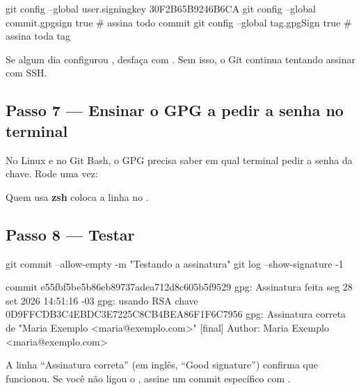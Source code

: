 \begin{terminal}
git config --global user.signingkey 30F2B65B9246B6CA
git config --global commit.gpgsign true     # assina todo commit
git config --global tag.gpgSign true        # assina toda tag
\end{terminal}

\begin{dica}
Se algum dia configurou , desfaça com . Sem isso, o Git continua tentando assinar com SSH.
\end{dica}

\subsection{Passo 7 — Ensinar o GPG a pedir a senha no terminal}

No Linux e no Git Bash, o GPG precisa saber em qual terminal pedir a senha da chave. Rode uma vez:


Quem usa \textbf{zsh} coloca a linha  no .

\subsection{Passo 8 — Testar}

\begin{terminal}
git commit --allow-empty -m "Testando a assinatura"
git log --show-signature -1
\end{terminal}
\begin{saida}
commit e55fbf5be5b86eb89737adea712d8c605b5f9529
gpg: Assinatura feita seg 28 set 2026 14:51:16 -03
gpg:                usando RSA chave 0D9FFCDB3C4EBDC3E7225C8CB4BEA86F1F6C7956
gpg: Assinatura correta de "Maria Exemplo <maria@exemplo.com>" [final]
Author: Maria Exemplo <maria@exemplo.com>
\end{saida}

A linha \enquote{Assinatura correta} (em inglês, \enquote{Good signature}) confirma que funcionou. Se você não ligou o , assine um commit específico com .

